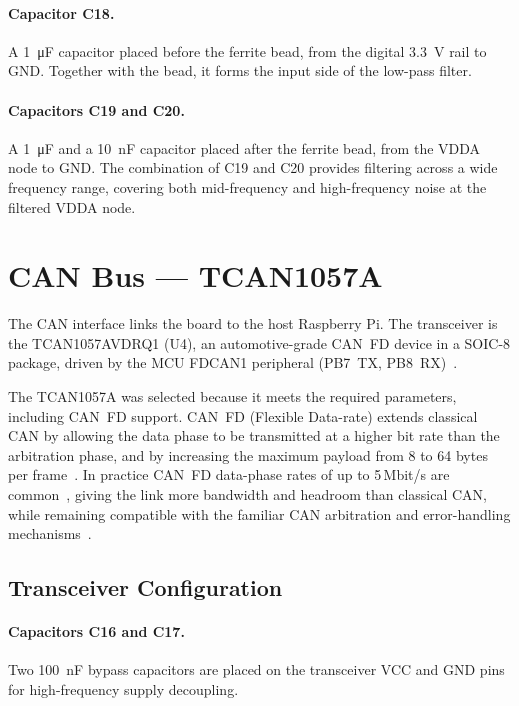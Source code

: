 \paragraph{Capacitor C18.}
A \SI{1}{\micro\farad} capacitor placed before the ferrite bead, from the digital
\SI{3.3}{\volt} rail to GND. Together with the bead, it forms the input side of the
low-pass filter.

\paragraph{Capacitors C19 and C20.}
A \SI{1}{\micro\farad} and a \SI{10}{\nano\farad} capacitor placed after the ferrite
bead, from the VDDA node to GND. The combination of C19 and C20 provides filtering across
a wide frequency range, covering both mid-frequency and high-frequency noise at the
filtered VDDA node.

\section{CAN Bus --- TCAN1057A}
\label{sec:can}

The CAN interface links the board to the host Raspberry Pi. The transceiver is the
TCAN1057AVDRQ1 (U4), an automotive-grade CAN~FD device in a SOIC-8 package, driven by
the MCU FDCAN1 peripheral (PB7~TX, PB8~RX)~\cite{ref7}.

The TCAN1057A was selected because it meets the required parameters, including CAN~FD
support. CAN~FD (Flexible Data-rate) extends classical CAN by allowing the data phase to
be transmitted at a higher bit rate than the arbitration phase, and by increasing the
maximum payload from 8 to 64 bytes per frame~\cite{ref14,ref15}. In practice CAN~FD
data-phase rates of up to 5\,Mbit/s are common~\cite{ref15}, giving the link more
bandwidth and headroom than classical CAN, while remaining compatible with the familiar
CAN arbitration and error-handling mechanisms~\cite{ref14}.

\subsection{Transceiver Configuration}
\label{subsec:can-config}

\paragraph{Capacitors C16 and C17.}
Two \SI{100}{\nano\farad} bypass capacitors are placed on the transceiver VCC and GND
pins for high-frequency supply decoupling.

